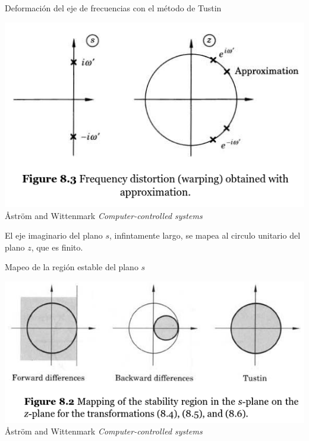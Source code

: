 \documentclass[presentation,aspectratio=1610]{beamer}
\begin{document}
\begin{frame}[label={sec:org57598b5}]{Deformación del eje de frecuencias con el método de Tustin}
\begin{center}
 \includegraphics[width=0.6\linewidth]{../../figures/fig8_3.png}\\
{\tiny Åström and Wittenmark \emph{Computer-controlled systems}}
\end{center}
El eje imaginario del plano \(s\), infintamente largo, se mapea al circulo unitario del plano \(z\), que es finito.
\end{frame}
\begin{frame}[label={sec:orge22b8d3}]{Mapeo de la región estable del plano \(s\)}
\begin{center}
 \includegraphics[width=0.79\linewidth]{../../figures/fig8-2.png}\\
{\tiny Åström and Wittenmark \emph{Computer-controlled systems}}
\end{center}
\end{frame}
\end{document}
